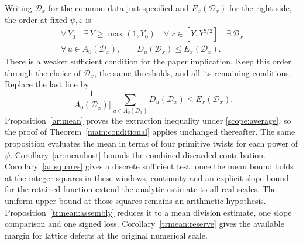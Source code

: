 Writing \(\mathcal D_x\) for the common data just specified and
\(E_x(\mathcal D_x)\) for the right side, the order at fixed
\(\psi,\varepsilon\) is
\[
\begin{gathered}
 \forall\,Y_0\quad \exists\,Y\ge\max(1,Y_0)\quad
 \forall\,x\in[Y,Y^{3/2}]\quad \exists\,\mathcal D_x\\
 \forall\,u\in A_0(\mathcal D_x),\qquad
           D_u(\mathcal D_x)\le E_x(\mathcal D_x).
\end{gathered}
\]
There is a weaker sufficient condition for the paper implication.
Keep this order through the choice of \(\mathcal D_x\), the same
thresholds, and all its remaining conditions. Replace the last line by
\begin{equation}\label{scope:average}
     \frac{1}{|A_0(\mathcal D_x)|}
       \sum_{u\in A_0(\mathcal D_x)}D_u(\mathcal D_x)
                \le E_x(\mathcal D_x).
\end{equation}
Proposition~\ref{ar:mean} proves the extraction inequality under
\eqref{scope:average}, so the proof of Theorem~\ref{main:conditional}
applies unchanged thereafter. The same proposition evaluates the
mean in terms of four primitive twists for each power of \(\psi\).
Corollary~\ref{ar:meanhost} bounds the combined discarded contribution.
Corollary~\ref{ar:squares} gives a discrete sufficient test: once
the mean bound holds at the integer squares in these windows,
continuity and an explicit slope bound for the retained function
extend the analytic estimate to all real scales. The uniform upper
bound at those squares remains an arithmetic hypothesis. Proposition~\ref{trmean:assembly} reduces it to a mean division estimate, one slope comparison and one signed loss. Corollary~\ref{trmean:reserve} gives the available margin for lattice defects at the original numerical scale.

